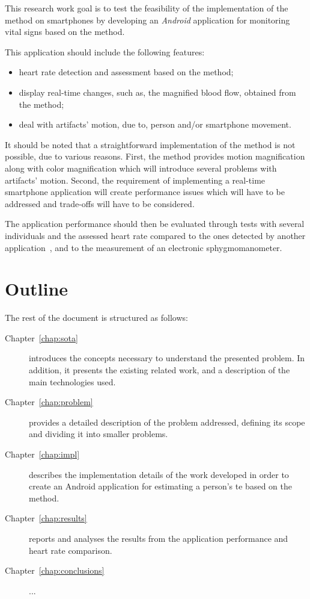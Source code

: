 
This research work goal is to test the feasibility of the
implementation of the \evm{} method on smartphones by developing
an \emph{Android} application for monitoring vital signs based on
the \evm{} method.

This application should include the following features:

\begin{itemize}
  \item heart rate detection and assessment based on the \evm{}
        method;
  \item display real-time changes, such as, the magnified blood
        flow, obtained from the \evm{} method;
  \item deal with artifacts' motion, due to, person and/or
        smartphone movement.
\end{itemize}

It should be noted that a straightforward implementation of the \evm{}
method is not possible, due to various reasons. First, the \evm{} method
provides motion magnification along with color magnification which will
introduce several problems with artifacts' motion. Second, the requirement
of implementing a real-time smartphone application will create performance
issues which will have to be addressed and trade-offs will have to be
considered.

The application performance should then be evaluated through tests
with several individuals and the assessed heart rate compared to
the ones detected by another application~\cite{Vitrox2013, Philips2013},
and to the measurement of an electronic sphygmomanometer.

\pagebreak

\section{Outline} \label{sec:intro:outline}


The rest of the document is structured as follows:

\begin{description}
  \item[Chapter~\ref{chap:sota}] introduces the concepts necessary to
        understand the presented problem. In addition, it presents
        the existing related work, and a description of the main
        technologies used.
  \item[Chapter~\ref{chap:problem}] provides a detailed description of the
        problem addressed, defining its scope and dividing it into
        smaller problems.
  \item[Chapter~\ref{chap:impl}] describes the implementation details of the
        work developed in order to create an Android application for estimating
        a person's te based on the \evm{} method.
  \item[Chapter~\ref{chap:results}] reports and analyses the results from
        the application performance and heart rate comparison.
  \item[Chapter~\ref{chap:conclusions}] ...
\end{description}
